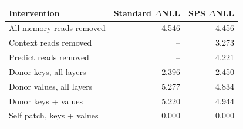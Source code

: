 \begin{tabular}{lrr}
\toprule
Intervention & Standard $\Delta$NLL & SPS $\Delta$NLL \\
\midrule
All memory reads removed & 4.546 & 4.456 \\
Context reads removed & -- & 3.273 \\
Predict reads removed & -- & 4.221 \\
Donor keys, all layers & 2.396 & 2.450 \\
Donor values, all layers & 5.277 & 4.834 \\
Donor keys + values & 5.220 & 4.944 \\
Self patch, keys + values & 0.000 & 0.000 \\
\bottomrule
\end{tabular}
